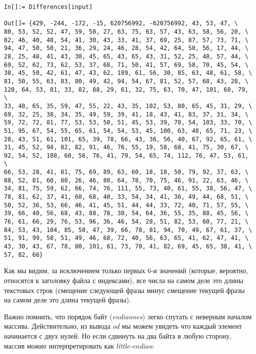 \begin{lstlisting}[style=custommath]
In[]:= Differences[input]

Out[]= {429, -244, -172, -15, 620756992, -620756992, 43, 53, 47, \
80, 53, 52, 52, 47, 59, 58, 27, 63, 75, 63, 57, 43, 63, 58, 56, 20, \
82, 46, 40, 48, 54, 41, 30, 43, 33, 41, 37, 69, 25, 87, 57, 73, 71, \
94, 47, 50, 50, 21, 36, 29, 24, 46, 28, 54, 42, 64, 50, 56, 17, 44, \
28, 25, 48, 41, 43, 30, 45, 65, 43, 65, 43, 31, 52, 25, 48, 57, 44, \
69, 52, 62, 73, 62, 53, 37, 68, 71, 50, 41, 57, 69, 58, 70, 45, 54, \
38, 45, 50, 42, 61, 47, 43, 62, 189, 61, 56, 30, 85, 63, 48, 61, 58, \
81, 50, 55, 63, 83, 80, 49, 42, 94, 54, 67, 81, 52, 57, 68, 43, 28, \
120, 64, 53, 81, 33, 82, 88, 29, 61, 32, 75, 63, 70, 47, 101, 60, 79, \
33, 48, 65, 35, 59, 47, 55, 22, 43, 35, 102, 53, 80, 65, 45, 31, 29, \
69, 32, 25, 38, 34, 35, 49, 59, 39, 41, 18, 43, 41, 83, 37, 31, 34, \
59, 72, 72, 81, 77, 53, 53, 50, 51, 45, 53, 39, 70, 54, 103, 33, 70, \
51, 95, 67, 54, 55, 65, 61, 54, 54, 53, 45, 100, 63, 48, 65, 71, 23, \
28, 43, 51, 61, 101, 65, 39, 78, 66, 43, 36, 56, 40, 67, 92, 65, 61, \
31, 45, 52, 94, 82, 82, 91, 46, 76, 55, 19, 58, 68, 41, 75, 30, 67, \
92, 54, 52, 108, 60, 56, 76, 41, 79, 54, 65, 74, 112, 76, 47, 53, 61, \
66, 53, 28, 41, 81, 75, 69, 89, 63, 60, 18, 18, 50, 79, 92, 37, 63, \
88, 52, 81, 60, 80, 26, 46, 80, 64, 78, 70, 75, 46, 91, 22, 63, 46, \
34, 81, 75, 59, 62, 66, 74, 76, 111, 55, 73, 40, 61, 55, 38, 56, 47, \
78, 81, 62, 37, 41, 60, 68, 40, 33, 54, 34, 41, 36, 49, 44, 68, 51, \
50, 52, 36, 53, 66, 46, 41, 45, 51, 44, 44, 33, 72, 40, 71, 57, 55, \
39, 66, 40, 56, 68, 43, 88, 78, 30, 54, 64, 36, 55, 35, 88, 45, 56, \
76, 61, 66, 29, 76, 53, 96, 36, 46, 54, 28, 51, 82, 53, 60, 77, 21, \
84, 53, 43, 104, 85, 50, 47, 39, 66, 78, 81, 94, 70, 49, 67, 61, 37, \
51, 91, 99, 58, 51, 49, 46, 68, 72, 40, 56, 63, 65, 41, 62, 47, 41, \
43, 30, 43, 67, 78, 80, 101, 61, 73, 70, 41, 82, 69, 45, 65, 38, 41, \
57, 82, 66}
\end{lstlisting}

Как мы видим, за исключением только первых 6-и значений
(которые, вероятно, относятся к заголовку файла с индексами),
все числа на самом деле это длины текстовых строк
(смещение следующей фразы минус смещение текущей фразы на самом деле это длина текущей фразы).

Важно помнить, что порядок байт (\emph{endiannes}) легко спутать с неверным началом массива.
Действительно, из вывода \emph{od} мы можем увидеть что каждый элемент начинается с двух нулей.
Но если сдвинуть на два байта в любую сторону, массив можно интерпретировать как \emph{little-endian}:

